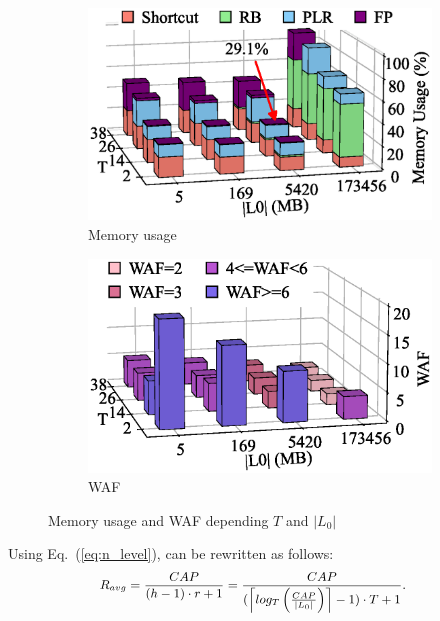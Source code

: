 \begin{figure}[t]
     \centering
     \begin{subfigure}[b]{0.23\textwidth}
         \centering
         \includegraphics[width=\textwidth]{figs/Figure_lsm_design/lsm_design/3d_memory/3d_memory2.eps}
         \caption{Memory usage}
     \end{subfigure}
     \hfill
     \begin{subfigure}[b]{0.23\textwidth}
         \centering
         \includegraphics[width=\textwidth]{figs/Figure_lsm_design/lsm_design/3d_waf/3d_waf_2.eps}
         \caption{WAF}
     \end{subfigure}  
     \vspace{-5pt}

	 \caption{Memory usage and WAF depending $T$ and $|L_0|$}
  \vspace{-5pt}
\label{fig:tree-org}
\end{figure}

Using Eq.~(\ref{eq:n_level}),  can be 
rewritten as follows:
\begin{equation}
\small
\begin{split}
	R_{avg} &= \frac{CAP}{(h-1) \cdot r + 1} = \frac{CAP}{(\ceil*{log_{T}\left(\frac{CAP}{|L_0|} \right)}-1)\cdot T+1}.
\end{split}
\label{eq:r_avg}
\end{equation}

